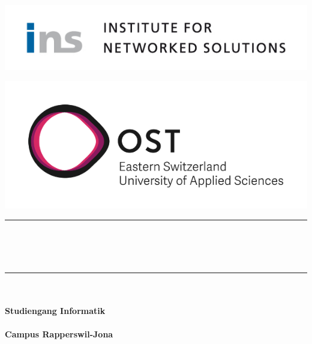 



\begin{titlepage}


   \newcommand{\HRule}{\color{black}\rule{\linewidth}{0.5mm}} %

   \center

   \begin{minipage}{0.49\linewidth}
      \vspace{2pt}
      \includegraphics[width=0.8\linewidth]{../style/img/INS_Icon}
      \hfill
   \end{minipage}
   \begin{minipage}{0.49\linewidth}
      \hfill
      \includegraphics[width=0.6\linewidth]{../style/img/OST_Icon}
   \end{minipage}

   \vspace*{\fill}

   \vspace{1.5cm}

   {\HRule} \\[0.7cm]
   {\Huge \bfseries \TITLE}\\[0.4cm]
   {\huge \bfseries \SUBTITLE}\\[0.4cm]

   {\HRule} \\[1.5cm]

   \textbf{\textsc{\Huge \SUBJECT}}\\[1.5cm]

   \Large
   \textbf{Studiengang Informatik}\\
   \textbf{\INSTITUTE}\\
   \textbf{Campus Rapperswil-Jona}\\


\end{titlepage}
